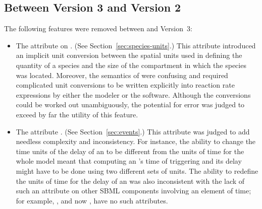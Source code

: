 \subsection{Between Version 3 and Version 2}

The following features were removed between \sbmltwotwo and
Version~3:
\begin{itemize}

\item The  attribute on \Species.  (See
  Section~\ref{sec:species-units}.)  This attribute introduced an
  implicit unit conversion between the spatial units used in
  defining the quantity of a species and the size of the
  compartment in which the species was located.  Moreover, the
  semantics of  were confusing and
  required complicated unit conversions to be written explicitly
  into reaction rate expressions by either the modeler or the
  software.  Although the conversions could be worked out
  unambiguously, the potential for error was judged to exceed by
  far the utility of this feature.

\item The  attribute \Event.  (See
  Section~\ref{sec:events}.)  This attribute was judged to add
  needless complexity and inconsistency.  For instance, the
  ability to change the time units of the delay of an \Event to be
  different from the units of time for the whole model meant that
  computing an \Event's time of triggering and its delay might
  have to be done using two different sets of units.  The ability
  to redefine the units of time for the delay of an \Event was
  also inconsistent with the lack of such an attribute on other SBML
  components involving an element of time; for example, \RateRule,
  and now \KineticLaw, have no such attributes.

\end{itemize}

